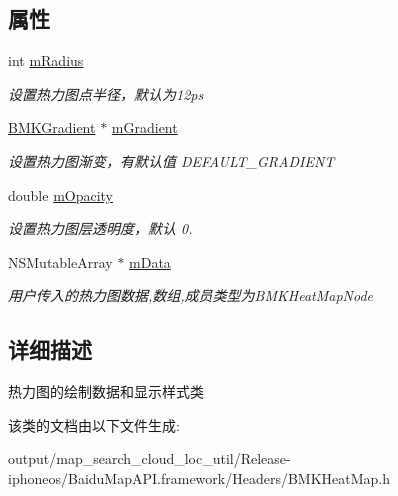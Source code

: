 \subsection*{属性}
\begin{DoxyCompactItemize}
\item 
\hypertarget{interface_b_m_k_heat_map_a3e1a824fe5eb272797ac9b39cc596519}{}int \hyperlink{interface_b_m_k_heat_map_a3e1a824fe5eb272797ac9b39cc596519}{m\+Radius}\label{interface_b_m_k_heat_map_a3e1a824fe5eb272797ac9b39cc596519}

\begin{DoxyCompactList}\small\item\em 设置热力图点半径，默认为12ps \end{DoxyCompactList}\item 
\hypertarget{interface_b_m_k_heat_map_a2457a3c31731e42bfba4d17e4c83801f}{}\hyperlink{interface_b_m_k_gradient}{B\+M\+K\+Gradient} $\ast$ \hyperlink{interface_b_m_k_heat_map_a2457a3c31731e42bfba4d17e4c83801f}{m\+Gradient}\label{interface_b_m_k_heat_map_a2457a3c31731e42bfba4d17e4c83801f}

\begin{DoxyCompactList}\small\item\em 设置热力图渐变，有默认值 D\+E\+F\+A\+U\+L\+T\+\_\+\+G\+R\+A\+D\+I\+E\+N\+T \end{DoxyCompactList}\item 
\hypertarget{interface_b_m_k_heat_map_aa012e076b6487c0670499f61e8fe807f}{}double \hyperlink{interface_b_m_k_heat_map_aa012e076b6487c0670499f61e8fe807f}{m\+Opacity}\label{interface_b_m_k_heat_map_aa012e076b6487c0670499f61e8fe807f}

\begin{DoxyCompactList}\small\item\em 设置热力图层透明度，默认 0. \end{DoxyCompactList}\item 
\hypertarget{interface_b_m_k_heat_map_aa433ebe06960ff584026d8d2d191a6fe}{}N\+S\+Mutable\+Array $\ast$ \hyperlink{interface_b_m_k_heat_map_aa433ebe06960ff584026d8d2d191a6fe}{m\+Data}\label{interface_b_m_k_heat_map_aa433ebe06960ff584026d8d2d191a6fe}

\begin{DoxyCompactList}\small\item\em 用户传入的热力图数据,数组,成员类型为\+B\+M\+K\+Heat\+Map\+Node \end{DoxyCompactList}\end{DoxyCompactItemize}


\subsection{详细描述}
热力图的绘制数据和显示样式类 

该类的文档由以下文件生成\+:\begin{DoxyCompactItemize}
\item 
output/map\+\_\+search\+\_\+cloud\+\_\+loc\+\_\+util/\+Release-\/iphoneos/\+Baidu\+Map\+A\+P\+I.\+framework/\+Headers/B\+M\+K\+Heat\+Map.\+h\end{DoxyCompactItemize}
